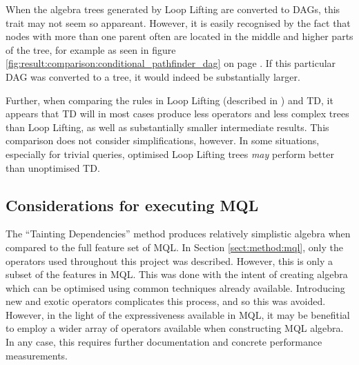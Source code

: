 When the algebra trees generated by Loop Lifting are converted to DAGs, this
trait may not seem so appareant. However, it is easily recognised by the fact
that nodes with more than one parent often are located in the middle and higher
parts of the tree, for example as seen in figure
\ref{fig:result:comparison:conditional_pathfinder_dag} on page
\pageref{fig:result:comparison:conditional_pathfinder_dag}. If this particular
DAG was converted to a tree, it would indeed be substantially larger.

Further, when comparing the rules in Loop Lifting (described in
\cite{pathfinder_mothertongue}) and TD, it appears that TD will in most cases
produce less operators and less complex trees than Loop Lifting, as well as
substantially smaller intermediate results. This comparison does not consider
simplifications, however. In some situations, especially for trivial queries,
optimised Loop Lifting trees \emph{may} perform better than unoptimised TD. 

\subsection{Considerations for executing MQL}
The ``Tainting Dependencies'' method produces relatively simplistic algebra
when compared to the full feature set of MQL. In Section \ref{sect:method:mql},
only the operators used throughout this project was described. However, this is
only a subset of the features in MQL. This was done with the intent of creating
algebra which can be optimised using common techniques already available.
Introducing new and exotic operators complicates this process, and so this was
avoided. However, in the light of the expressiveness available in MQL, it may
be benefitial to employ a wider array of operators available when constructing
MQL algebra. In any case, this requires further documentation and concrete
performance measurements.